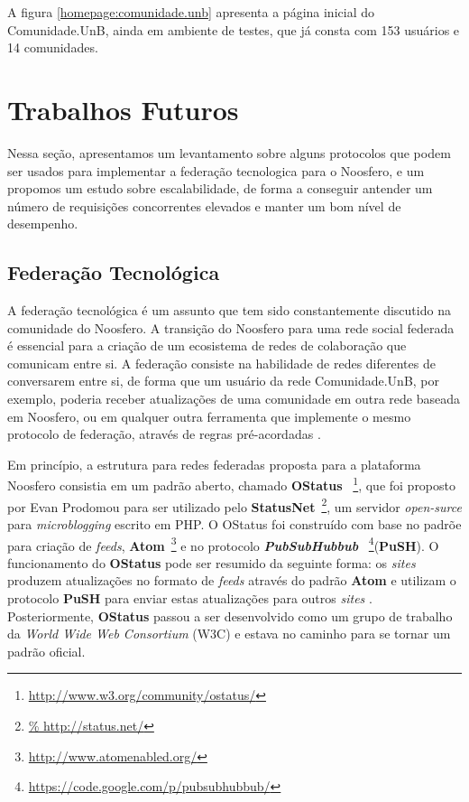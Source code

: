 A figura \ref{homepage:comunidade.unb} apresenta a página inicial do
Comunidade.UnB, ainda em ambiente de testes, que já consta com 153 usuários
e 14 comunidades.

\section{Trabalhos Futuros}

Nessa seção, apresentamos um levantamento sobre alguns protocolos que
podem ser usados para implementar a federação tecnologica para o Noosfero, e
um propomos um estudo sobre escalabilidade, de forma a conseguir antender
um número de requisições concorrentes elevados e manter um bom nível de
desempenho.

\subsection{Federação Tecnológica}

A federação tecnológica é um assunto que tem sido constantemente discutido
na comunidade do Noosfero. A transição do Noosfero para uma rede social federada
é essencial para a criação de um ecosistema de redes de colaboração que
comunicam entre si.
%
A federação consiste na habilidade de redes diferentes de conversarem entre si,
de forma que um usuário da rede Comunidade.UnB, por exemplo, poderia receber
atualizações de uma comunidade em outra rede baseada em Noosfero, ou em
qualquer outra ferramenta que implemente o mesmo protocolo de federação,
através de regras pré-acordadas \cite{prodomou2010}.

Em princípio, a estrutura para redes federadas proposta para a plataforma Noosfero
consistia em um padrão aberto, chamado \textbf{OStatus}
~\footnote{\url{http://www.w3.org/community/ostatus/}}, que foi proposto
por Evan Prodomou para ser utilizado pelo \textbf{StatusNet}~\footnote{\url{%
http://status.net/}}, um servidor  \textit{open-surce} para
\textit{microblogging} escrito em PHP.
%
O OStatus foi construído com base no padrõe para criação de \textit{feeds},
\textbf{Atom}~\footnote{\url{http://www.atomenabled.org/}} e no
protocolo \textbf{\textit{PubSubHubbub}}%
~\footnote{\url{https://code.google.com/p/pubsubhubbub/}}(\textbf{PuSH}).
%
O funcionamento do \textbf{OStatus} pode ser resumido da seguinte forma:
os \textit{sites} produzem atualizações no formato de \textit{feeds} através
do padrão \textbf{Atom} e utilizam o protocolo \textbf{PuSH}
para enviar estas atualizações para outros \textit{sites} \cite{OStatusBasics}.
%
Posteriormente, \textbf{OStatus} passou a ser desenvolvido como um
grupo de trabalho da \textit{World Wide Web Consortium} (W3C) e estava no
caminho para se tornar um padrão oficial.

